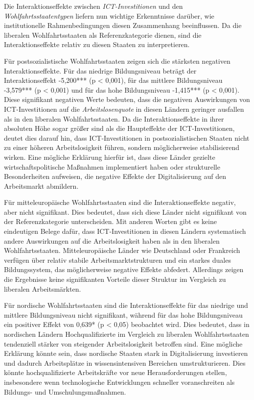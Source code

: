 Die Interaktionseffekte zwischen \textit{\ac{ICT}-Investitionen} und den 
\textit{Wohlfahrtsstaatentypen} liefern nun wichtige Erkenntnisse darüber, wie 
institutionelle Rahmenbedingungen diesen Zusammenhang beeinflussen. Da die liberalen 
Wohlfahrtsstaaten als Referenzkategorie dienen, sind die Interaktionseffekte relativ 
zu diesen Staaten zu interpretieren.

Für postsozialistische Wohlfahrtsstaaten zeigen sich die stärksten negativen 
Interaktionseffekte. Für das niedrige Bildungsniveau beträgt der Interaktionseffekt 
-5,200*** (p < 0,001), für das mittlere Bildungsniveau -3,579*** (p < 0,001) und für 
das hohe Bildungsniveau -1,415*** (p < 0,001). Diese signifikant negativen Werte 
bedeuten, dass die negativen Auswirkungen von \ac{ICT}-Investitionen auf die 
\textit{Arbeitslosenquote} in diesen Ländern geringer ausfallen als in den liberalen 
Wohlfahrtsstaaten. Da die Interaktionseffekte in ihrer absoluten Höhe sogar größer 
sind als die Haupteffekte der \ac{ICT}-Investitionen, deutet dies darauf hin, dass 
\ac{ICT}-Investitionen in postsozialistischen Staaten nicht zu einer höheren 
Arbeitslosigkeit führen, sondern möglicherweise stabilisierend wirken. Eine 
mögliche Erklärung hierfür ist, dass diese Länder gezielte wirtschaftspolitische 
Maßnahmen implementiert haben oder strukturelle Besonderheiten aufweisen, die 
negative Effekte der Digitalisierung auf den Arbeitsmarkt abmildern.

Für mitteleuropäische Wohlfahrtsstaaten sind die Interaktionseffekte negativ, aber 
nicht signifikant. Dies bedeutet, dass sich diese Länder nicht signifikant von der 
Referenzkategorie unterscheiden. Mit anderen Worten gibt es keine eindeutigen Belege 
dafür, dass \ac{ICT}-Investitionen in diesen Ländern systematisch andere Auswirkungen 
auf die Arbeitslosigkeit haben als in den liberalen Wohlfahrtsstaaten. 
Mitteleuropäische Länder wie Deutschland oder Frankreich verfügen über relativ stabile 
Arbeitsmarktstrukturen und ein starkes duales Bildungssystem, das möglicherweise 
negative Effekte abfedert. Allerdings zeigen die Ergebnisse keine signifikanten 
Vorteile dieser Struktur im Vergleich zu liberalen Arbeitsmärkten.

Für nordische Wohlfahrtsstaaten sind die Interaktionseffekte für das niedrige und 
mittlere Bildungsniveau nicht signifikant, während für das hohe Bildungsniveau ein 
positiver Effekt von 0,639* (p < 0,05) beobachtet wird. Dies bedeutet, dass in 
nordischen Ländern Hochqualifizierte im Vergleich zu liberalen Wohlfahrtsstaaten 
tendenziell stärker von steigender Arbeitslosigkeit betroffen sind. Eine mögliche 
Erklärung könnte sein, dass nordische Staaten stark in Digitalisierung investieren 
und dadurch Arbeitsplätze in wissensintensiven Bereichen umstrukturieren. Dies 
könnte hochqualifizierte Arbeitskräfte vor neue Herausforderungen stellen, 
insbesondere wenn technologische Entwicklungen schneller voranschreiten als 
Bildungs- und Umschulungsmaßnahmen.


